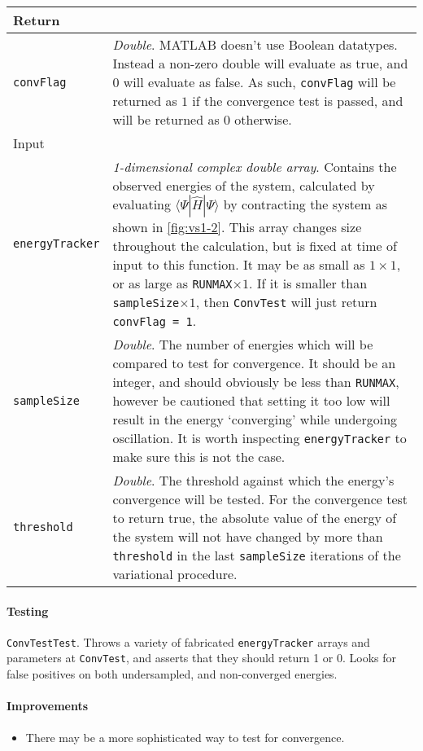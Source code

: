  \begin{longtabu}{X[1,l]X[4,l]}
 \hline
 Return & \\ \hline
 \lstinline$convFlag$ & \emph{Double}. MATLAB doesn't use Boolean datatypes. Instead a non-zero double will evaluate as true, and \(0\) will evaluate as false. As such, \lstinline$convFlag$ will be returned as \(1\) if the convergence test is passed, and will be returned as \(0\) otherwise. \\ \hline
 Input & \\ \hline
 \lstinline$energyTracker$ & \emph{1-dimensional complex double array}. Contains the observed energies of the system, calculated by evaluating \(\langle \Psi | \hat{H} | \Psi \rangle\) by contracting the system as shown in \cref{fig:vs1-2}. This array changes size throughout the calculation, but is fixed at time of input to this function. It may be as small as \(1 \times 1\), or as large as \lstinline$RUNMAX$\( \times 1\). If it is smaller than \lstinline$sampleSize$\(\times 1\), then \lstinline$ConvTest$ will just return \lstinline$convFlag = 1$. \\
 \lstinline$sampleSize$ & \emph{Double}. The number of energies which will be compared to test for convergence. It should be an integer, and should obviously be less than \lstinline$RUNMAX$, however be cautioned that setting it too low will result in the energy `converging' while undergoing oscillation. It is worth inspecting \lstinline$energyTracker$ to make sure this is not the case. \\
 \lstinline$threshold$ & \emph{Double}. The threshold against which the energy's convergence will be tested. For the convergence test to return true, the absolute value of the energy of the system will not have changed by more than \lstinline$threshold$ in the last \lstinline$sampleSize$ iterations of the variational procedure. \\
 \hline
 \end{longtabu}
 \paragraph{Testing}
 \lstinline$ConvTestTest$. Throws a variety of fabricated \lstinline$energyTracker$ arrays and parameters at \lstinline$ConvTest$, and asserts that they should return 1 or 0. Looks for false positives on both undersampled, and non-converged energies.
 \paragraph{Improvements}
 \begin{itemize}
 \item There may be a more sophisticated way to test for convergence. 
\end{itemize}  

